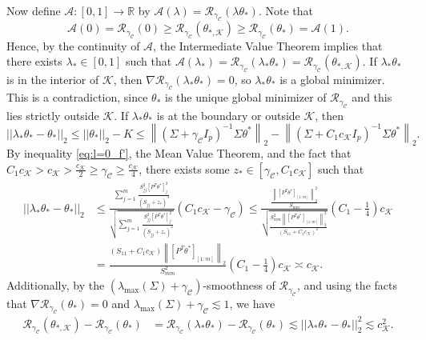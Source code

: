 \documentclass{article}
\begin{document}
Now define $\mathcal{A} : [0, 1] \rightarrow \mathbb{R}$ by $\mathcal{A}(\lambda) = \mathcal{R}_{\gamma_{\mathcal{C}}}(\lambda\theta_*)$. Note that
$$\mathcal{A}(0) = \mathcal{R}_{\gamma_{\mathcal{C}}}(0) \geq \mathcal{R}_{\gamma_{\mathcal{C}}}(\theta_{*, \mathcal{K}}) \geq \mathcal{R}_{\gamma_{\mathcal{C}}}(\theta_*) = \mathcal{A}(1).$$
Hence, by the continuity of $\mathcal{A}$, the Intermediate Value Theorem implies that there exists $\lambda_* \in [0, 1]$ such that $\mathcal{A}(\lambda_*) = \mathcal{R}_{\gamma_{\mathcal{C}}}(\lambda_*\theta_*) = \mathcal{R}_{\gamma_{\mathcal{C}}}(\theta_{*, \mathcal{K}})$. If $\lambda_*\theta_*$ is in the interior of $\mathcal{K}$, then $\nabla\mathcal{R}_{\gamma_{\mathcal{C}}}(\lambda_*\theta_*) = 0$, so $\lambda_*\theta_*$ is a global minimizer. This is a contradiction, since $\theta_*$ is the unique global minimizer of $\mathcal{R}_{\gamma_{\mathcal{C}}}$ and this lies strictly outside $\mathcal{K}$. If $\lambda_*\theta_*$ is at the boundary or outside $\mathcal{K}$, then $$||\lambda_*\theta_* - \theta_*||_2 \leq ||\theta_*||_2 - K \leq \left\|\left(\Sigma + \gamma_{\mathcal{C}}I_p\right)^{-1}\Sigma\theta^*\right\|_2 - \left\|\left(\Sigma + C_1c_{\mathcal{K}}I_p\right)^{-1}\Sigma\theta^*\right\|_2.$$ By inequality \eqref{eq:l=0_f'}, the Mean Value Theorem, and the fact that $C_1c_{\mathcal{K}} > c_{\mathcal{K}} > \frac{c_{\mathcal{K}}}{2} \geq \gamma_{\mathcal{C}} \geq \frac{c_{\mathcal{K}}}{4}$, there exists some $z_* \in \left[\gamma_{\mathcal{C}}, C_1c_{\mathcal{K}}\right]$ such that
\begin{align*}
||\lambda_*\theta_* - \theta_*||_2 &\leq \frac{\sum_{j = 1}^m\frac{S_{jj}^2[P^T\theta^*]_j^2}{(S_{jj} + z_*)^3}}{\sqrt{\sum_{j = 1}^m\frac{S_{jj}^2[P^T\theta^*]_j^2}{(S_{jj} + z_*)^2}}}(C_1c_{\mathcal{K}} - \gamma_{\mathcal{C}}) \leq \frac{\frac{\left\|[P^T\theta^*]_{[1:m]}\right\|_2^2}{S_{mm}}}{\sqrt{\frac{S^2_{mm}\left\|[P^T\theta^*]_{[1:m]}\right\|_2^2}{(S_{11} + C_1c_{\mathcal{K}})^2}}}\left(C_1 - \frac{1}{4}\right)c_{\mathcal{K}}\\
&= \frac{(S_{11} + C_1c_{\mathcal{K}})\left\|[P^T\theta^*]_{[1:m]}\right\|_2}{S^2_{mm}}\left(C_1 - \frac{1}{4}\right)c_{\mathcal{K}} \asymp c_{\mathcal{K}}.
\end{align*}
Additionally, by the $(\lambda_{\max}(\Sigma) + \gamma_{\mathcal{C}})$-smoothness of $\mathcal{R}_{\gamma_{\mathcal{C}}}$, and using the facts that $\nabla \mathcal{R}_{\gamma_{\mathcal{C}}}(\theta_{*}) = 0$ and $\lambda_{\max}(\Sigma) + \gamma_{\mathcal{C}} \lesssim 1$, we have
\begin{align*}
\mathcal{R}_{\gamma_{\mathcal{C}}}(\theta_{*, \mathcal{K}}) - \mathcal{R}_{\gamma_{\mathcal{C}}}(\theta_{*}) &= \mathcal{R}_{\gamma_{\mathcal{C}}}(\lambda_*\theta_*) - \mathcal{R}_{\gamma_{\mathcal{C}}}(\theta_{*}) \lesssim ||\lambda_*\theta_{*} - \theta_*||_2^2 \lesssim c_{\mathcal{K}}^2.
\end{align*}
\end{document}
